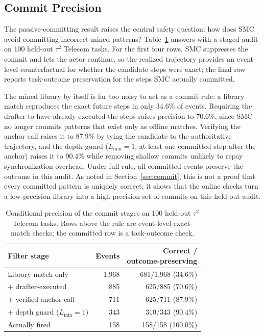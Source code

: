 \subsection{Commit Precision}

The passive-committing result raises the central safety question: how does SMC avoid committing incorrect mined patterns? Table~\ref{tab:filter-precision} answers with a staged audit on 100 held-out $\tau^2$ Telecom tasks.
For the first four rows, SMC suppresses the commit and lets the actor continue, so the realized trajectory provides an event-level counterfactual for whether the candidate steps were exact; the final row reports task-outcome preservation for the steps SMC actually committed.

The mined library by itself is far too noisy to act as a commit rule: a library match reproduces the exact future steps in only 34.6\% of events. 
Requiring the drafter to have already executed the steps raises precision to 70.6\%, since SMC no longer commits patterns that exist only as offline matches. 
Verifying the anchor call raises it to 87.9\% by tying the candidate to the authoritative trajectory, and the depth guard ($L_{\min}=1$, at least one committed step after the anchor) raises it to 90.4\% while removing shallow commits unlikely to repay synchronization overhead. 
Under full rule, all committed events preserve the outcome in this audit. 
As noted in Section~\ref{sec:commit}, this is not a proof that every committed pattern is uniquely correct; it shows that the online checks turn a low-precision library into a high-precision set of commits on this held-out audit.

\begin{table}[t]
\centering
\small
\caption{Conditional precision of the commit stages on 100 held-out $\tau^2$ Telecom tasks. Rows above the rule are event-level exact-match checks; the committed row is a task-outcome check.}
\label{tab:filter-precision}
\begin{tabular}{lrr}
\toprule
Filter stage & Events & \makecell{Correct / \\outcome-preserving} \\
\midrule
Library match only & 1,968 & 681/1,968 (34.6\%) \\
+ drafter-executed & 885 & 625/885 (70.6\%) \\
+ verified anchor call & 711 & 625/711 (87.9\%) \\
+ depth guard ($L_{\min}=1$) & 343 & 310/343 (90.4\%) \\
\midrule
Actually fired & 158 & 158/158 (100.0\%) \\
\bottomrule
\end{tabular}
\end{table}

